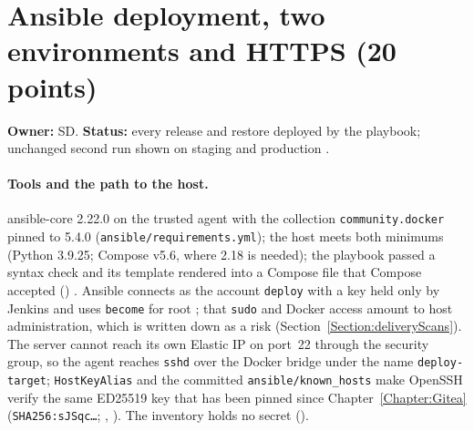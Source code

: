 \begin{longlisting}
\inputminted[fontsize=\scriptsize]{text}{evidence/177-v2-records-build-list-restore-run-recaps-traceability-final-state-sd-2026-11-17.txt}
\caption{Build lists of both jobs, the restore-run recaps, the build \#8 and v2 digests, the v2 records and the final public state, November 17, 2026, 11:34~PM (real output; read-only).}
\label{Listing:E177}
\end{longlisting}

\section{Ansible deployment, two environments and HTTPS (20 points)}\label{Section:deliveryAnsible}
\textbf{Owner:} SD. \textbf{Status:} every release and restore deployed by the playbook; unchanged second run shown on staging and production \StatusPass.

\paragraph{Tools and the path to the host.} ansible-core 2.22.0 on the trusted agent with the collection \texttt{community.docker} pinned to 5.4.0 (\texttt{ansible/requirements.yml}); the host meets both minimums (Python 3.9.25; Compose v5.6, where 2.18 is needed);
the playbook passed a syntax check and its template rendered into a Compose file that Compose accepted () \cite{AnsibleGettingStarted}. Ansible connects as the account \texttt{deploy} with a key held only by Jenkins and uses \texttt{become}
for root \cite{AnsibleBecome}; that \texttt{sudo} and Docker access amount to host administration, which is written down as a risk (Section~\ref{Section:deliveryScans}). The server cannot reach its own Elastic IP on port~22 through the security group, so the agent reaches
\texttt{sshd} over the Docker bridge under the name \texttt{deploy-target}; \texttt{HostKeyAlias} and the committed \texttt{ansible/known\_hosts} make OpenSSH verify the same ED25519 key that has been pinned since Chapter~\ref{Chapter:Gitea}
(\texttt{SHA256:sJSqc\ldots}; , ). The inventory holds no secret ().

